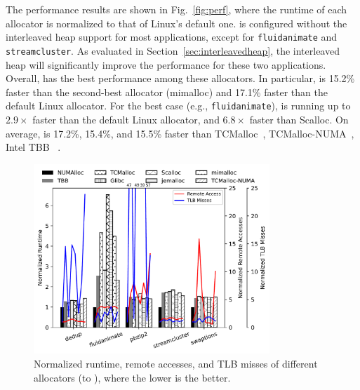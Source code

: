 The performance results are shown in Fig.~\ref{fig:perf}, where the runtime of each allocator is normalized to that of Linux's default one. \NM{} is configured without the interleaved heap support for most applications, except for \texttt{fluidanimate} and \texttt{streamcluster}. As evaluated in Section~\ref{sec:interleavedheap}, the interleaved heap will significantly improve the performance for these two applications. 
Overall, \NM{} has the best performance among these allocators. In particular, \NM{} is 15.2\% faster than the second-best allocator (mimalloc) and 17.1\% faster than the default Linux allocator. %
For the best case (e.g., \texttt{fluidanimate}), \NM{} is running up to $2.9\times$ faster than the default Linux allocator, and $6.8\times$ faster than Scalloc.
On average, \NM{} is 17.2\%, 15.4\%, and 15.5\% faster than TCMalloc~\cite{tcmalloc2}, TCMalloc-NUMA~\cite{tcmallocnew}, Intel TBB ~\cite{tbb3}.

\begin{figure}[!h]
    \centering 
    \includegraphics[width=3.5in]{SC2022/figure/remote access.pdf}
    \caption{Normalized runtime, remote accesses, and TLB misses of different allocators (to \NM{}), where the lower is the better. }
    \label{fig:remoteAccess}
\end{figure}

